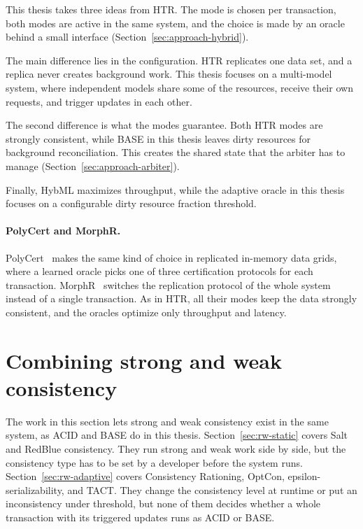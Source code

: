 This thesis takes three ideas from HTR. The mode is chosen per transaction,
both modes are active in the same system, and the choice is made by an oracle
behind a small interface (Section~\ref{sec:approach-hybrid}).

The main difference lies in the configuration. HTR replicates one data set, and
a replica never creates background work. This thesis focuses on a multi-model
system, where independent models share some of the resources, receive their own
requests, and trigger updates in each other.

The second difference is what the modes guarantee. Both HTR modes are strongly
consistent, while BASE in this thesis leaves dirty resources for background
reconciliation. This creates the shared state that the arbiter has to manage
(Section~\ref{sec:approach-arbiter}).

Finally, HybML maximizes throughput, while the adaptive oracle in this thesis
focuses on a configurable dirty resource fraction threshold.

\paragraph{PolyCert and MorphR.} PolyCert~\cite{couceiro2011polycert} makes the
same kind of choice in replicated in-memory data grids, where a learned oracle
picks one of three certification protocols for each transaction.
MorphR~\cite{couceiro2013morphr} switches the replication protocol of the whole
system instead of a single transaction. As in HTR, all their modes keep the data
strongly consistent, and the oracles optimize only throughput and latency.

\section{Combining strong and weak consistency}\label{sec:rw-acid-base}

The work in this section lets strong and weak consistency exist in the same
system, as ACID and BASE do in this thesis.
Section~\ref{sec:rw-static} covers Salt and RedBlue consistency. They run strong
and weak work side by side, but the consistency type has to be set by a
developer before the system runs. Section~\ref{sec:rw-adaptive} covers
Consistency Rationing, OptCon, epsilon-serializability, and TACT. They change the
consistency level at runtime or put an inconsistency under threshold, but none
of them decides whether a whole transaction with its triggered updates runs as
ACID or BASE.

